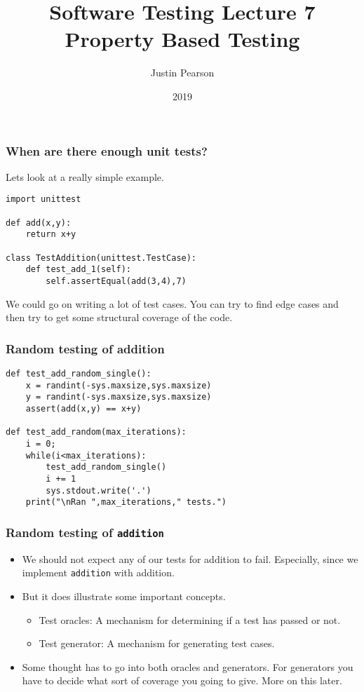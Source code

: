 \documentclass{beamer}
\title{Software Testing  Lecture 7 \\ Property Based Testing}
\author{Justin Pearson}
\date{2019}
\begin{document}
\lstset{language=Python}

\begin{frame}
  \maketitle
\end{frame}

\begin{frame}[fragile]
  \frametitle{When are there enough unit tests?}
  Lets look at a really simple example.
  \begin{lstlisting}
import unittest

def add(x,y):
    return x+y

class TestAddition(unittest.TestCase):
    def test_add_1(self):
        self.assertEqual(add(3,4),7)

      \end{lstlisting}
We could go on writing a lot of test cases. You can try to find edge cases and
then try to get some structural coverage of the code. 
\end{frame}
\begin{frame}[fragile]
  \frametitle{Random testing of addition}
  \begin{lstlisting}
def test_add_random_single():
    x = randint(-sys.maxsize,sys.maxsize)
    y = randint(-sys.maxsize,sys.maxsize)
    assert(add(x,y) == x+y)

def test_add_random(max_iterations):
    i = 0;
    while(i<max_iterations):
        test_add_random_single()
        i += 1
        sys.stdout.write('.')
    print("\nRan ",max_iterations," tests.")
  \end{lstlisting}
\end{frame}
\begin{frame}
  \frametitle{Random testing of {\tt addition}}
  \begin{itemize}
  \item We should not expect any of our tests for addition to
    fail. Especially, since we implement {\tt addition} with addition.
  \item But it does illustrate some important concepts.
    \begin{itemize}
    \item Test oracles: A mechanism for determining if a test has passed or
      not.
    \item Test generator: A mechanism for generating test cases. 
      
    \end{itemize}
  \item Some thought has to go into both oracles and generators. For
    generators you have to decide what sort of coverage you going to
    give. More on this later.
  \end{itemize}
  
\end{frame}
\end{document}
